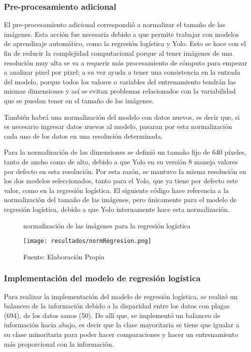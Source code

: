 \subsubsection{Pre-procesamiento adicional}

El pre-procesamiento adicional correspondió a normalizar el tamaño de las imágenes. Esta acción fue necesaria debido a que permite trabajar con modelos de aprendizaje automático, como la regresión logística y Yolo. Esto se hace con el fin de reducir la complejidad computacional porque al tener imágenes de una resolución muy alta se va a requerir más procesamiento de cómputo para empezar a analizar pixel por pixel; a su vez ayuda a tener una consistencia en la entrada del modelo, porque todos los valores o variables del entrenamiento tendrán las mismas dimensiones y así se evitan problemas relacionados con la variabilidad que se puedan tener en el tamaño de las imágenes.

También habrá una normalización del modelo con datos nuevos, es decir que, si es necesario ingresar datos nuevos al modelo, pasaran por esta normalización cada uno de los datos en una resolución determinada.

Para la normalización de las dimensiones se definió un tamaño fijo de 640 píxeles, tanto de ancho como de alto, debido a que Yolo en su versión 8 maneja valores por defecto en esta resolución. Por esta razón, se mantuvo la misma resolución en los dos modelos seleccionados, tanto para el Yolo, que ya tiene por defecto este valor, como en la regresión logística. El siguiente código hace referencia a la normalización del tamaño de las imágenes, pero únicamente para el modelo de regresión logística, debido a que Yolo internamente hace esta normalización.

\begin{figure}[h]
\centering
\caption{normalización de las imágenes para la regresión logística}
\texttt{[image: resultados/normRegresion.png]}
\caption*{\footnotesize Fuente: Elaboración Propia}
\label{fig:figuraNormRegresion}
\end{figure}

\newpage

\subsubsection{Implementación del modelo de regresión logística}

Para realizar la implementación del modelo de regresión logística, se realizó un balanceo de la información debido a la disparidad entre los datos con plagas (694), de los datos sanos (50). De allí que, se implementó un balanceo de información hacia abajo, es decir que la clase mayoritaria se tiene que igualar a su clase minoritaria para poder hacer comparaciones y hacer un entrenamiento más proporcional con la información.

